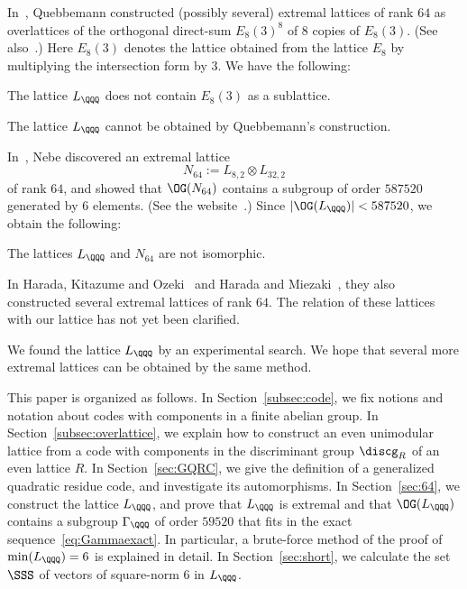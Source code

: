 \documentclass{amsart}
\begin{document}
%
\par
%
In~\cite{Que84}, Quebbemann constructed 
(possibly several) extremal lattices of rank $64$
as overlattices of the orthogonal direct-sum $E_8(3)^8$
of $8$ copies of $E_8(3)$.
(See also~\cite[Chapter 8.3]{CS99}.)
Here  $E_8(3)$ denotes the lattice obtained from the lattice $E_8$
by multiplying the intersection form by $3$.
We have the following:
%
\begin{proposition}\label{prop:EEE8}
The lattice $L_{\QQQ}$ does not contain $E_8(3)$ as a sublattice.
\end{proposition}
%
\begin{corollary}
The lattice $L_{\QQQ}$ cannot be obtained by Quebbemann's construction.
\end{corollary}
%
%
In~\cite{N98}, Nebe discovered an extremal lattice 
$$
N_{64}:=L_{8, 2}\otimes L_{32, 2}
$$
of rank $64$, and showed that $\OG(N_{64})$ contains a subgroup
of order $587520$ generated by $6$ elements. (See the website~\cite{NS}.)
Since  $|\OG(L_{\QQQ})|<587520$,
we obtain the following:
%
\begin{corollary}\label{cor:notisom}
The lattices  $L_{\QQQ}$ and $N_{64}$ are not isomorphic.
\end{corollary}
%
In Harada, Kitazume and Ozeki~\cite{HKO2002} and Harada and Miezaki~\cite{HM2014},
they also constructed several extremal lattices of rank $64$.
The relation of these lattices with our lattice has not yet been clarified.
%
\par
We found the lattice $L_{\QQQ}$ by an experimental search.
We hope that several more extremal lattices
can be obtained by the same method.
\par
\medskip
%
%
This paper is organized as follows.
In Section~\ref{subsec:code},
we fix notions and notation
about codes with components in a finite abelian group.
In Section~\ref{subsec:overlattice},
we explain how to construct an even unimodular  lattice
from a code with components in the discriminant group  $\discg_R$
of an even lattice $R$.
In Section~\ref{sec:GQRC}, 
we give the definition  of a generalized quadratic residue code,
and investigate its automorphisms.
In Section~\ref{sec:64},
we construct the lattice $L_{\QQQ}$, and 
prove that $L_{\QQQ}$ is extremal and that
$\OG(L_{\QQQ})$ contains a subgroup $\Gamma_{\QQQ}$ of order $59520$
that fits in the exact sequence~\eqref{eq:Gammaexact}.
In particular, a brute-force  method of 
the proof of $\min(L_{\QQQ})=6$
is explained in  detail.
In Section~\ref{sec:short},
we calculate the set $\SSS$ of  vectors of square-norm $6$ in $L_{\QQQ}$.
\end{document}
